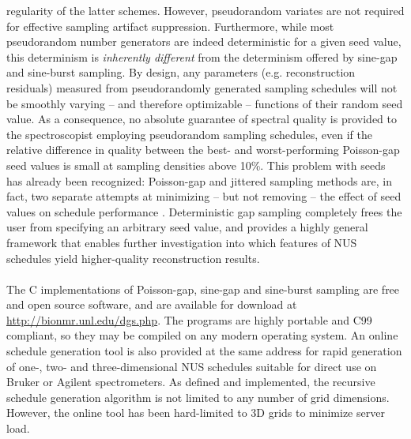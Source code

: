 \begin{doublespace}
regularity of the latter schemes. However, pseudorandom variates are
not required for effective sampling artifact suppression. Furthermore,
while most pseudorandom number generators are indeed deterministic for a
given seed value, this determinism is \emph{inherently different} from the
determinism offered by sine-gap and sine-burst sampling. By design, any
parameters (e.g. reconstruction residuals) measured from pseudorandomly
generated sampling schedules will not be smoothly varying -- and therefore
optimizable -- functions of their random seed value. As a consequence, no
absolute guarantee of spectral quality is provided to the spectroscopist
employing pseudorandom sampling schedules, even if the relative difference
in quality between the best- and worst-performing Poisson-gap seed values
is small at sampling densities above 10\%. This problem with seeds has
already been recognized: Poisson-gap and jittered sampling methods are, in
fact, two separate attempts at minimizing -- but not removing -- the effect
of seed values on schedule performance
\cite{hyberts:jacs2010,kazimierczuk:jmr2007,mobli:jmr2015}. Deterministic
gap sampling completely frees the user from specifying an arbitrary seed
value, and provides a highly general framework that enables further
investigation into which features of NUS schedules yield higher-quality
reconstruction results.
\\\\
The C implementations of Poisson-gap, sine-gap and sine-burst sampling are
free and open source software, and are available for download at
\url{http://bionmr.unl.edu/dgs.php}. The programs are highly portable and
C99 compliant, so they may be compiled on any modern operating system. An
online schedule generation tool is also provided at the same address for
rapid generation of one-, two- and three-dimensional NUS schedules suitable
for direct use on Bruker or Agilent spectrometers. As defined and implemented,
the recursive schedule generation algorithm is not limited to any number of
grid dimensions. However, the online tool has been hard-limited to 3D grids
to minimize server load.
\end{doublespace}




